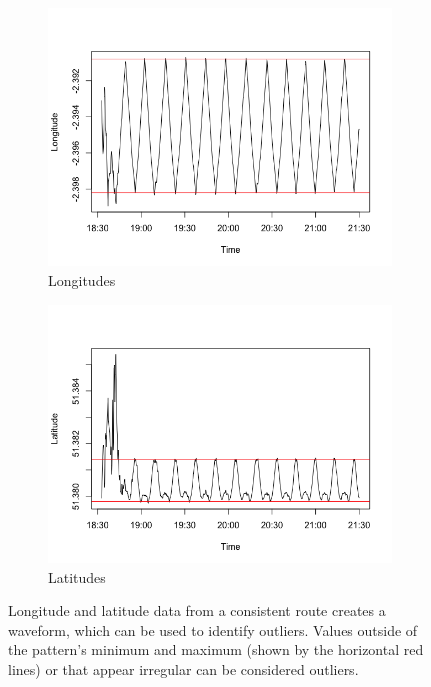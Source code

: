 \documentclass[11pt]{report}
\begin{document}
\begin{figure}[!tb]
    \centering
    \begin{minipage}{1\linewidth}
            \begin{subfigure}[t]{.5\linewidth}
                \includegraphics[width=\textwidth]{images/wave_longitudes}
                \caption{Longitudes}
                \label{fig:wave_longitudes}
            \end{subfigure}
            \begin{subfigure}[t]{.5\linewidth}
            	\includegraphics[width=\textwidth]{images/wave_latitudes}
            	\caption{Latitudes}
            	\label{fig:wave_latitudes}
	   \end{subfigure}
        \end{minipage}
    \caption[Longitude and latitude waveforms.]{Longitude and latitude data from a consistent route creates a waveform, which can be used to identify outliers. Values outside of the pattern's minimum and maximum (shown by the horizontal red lines) or that appear irregular can be considered outliers.}
    \label{fig:waves}
\end{figure}
\end{document}
